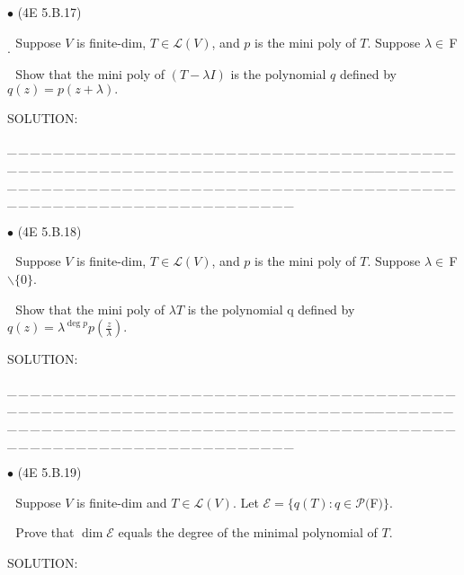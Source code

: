 \documentclass[a4paper, 11pt, UTF8]{article}
\def\Lm{\mathcal{L}}
\def\Po{\mathcal{P}}
\def\Fbfc{$\,{\timesbf F}$}
\begin{document}
\begin{large}
{\small $\bullet$} (\normalsize{4E 5.B.17})\par\,\, {\timessl\Large 
Suppose $V$ is finite-dim, $T\in \Lm(V)$, and $p$ is the mini poly of $T$. Suppose $\lambda \in\Fbfc.$}\par\,\,
{\timessl\Large Show that the mini poly of $(T - \lambda I)$ is the polynomial $q$ defined by $q(z) = p(z + \lambda).$
}\par
{\timesbf S\footnotesize{OLUTION:}}\par\quad

\par
{\tiny \_\,\_\,\_\,\_\,\_\,\_\,\_\,\_\,\_\,\_\,\_\,\_\,\_\,\_\,\_\,\_\,\_\,\_\,\_\,\_\,\_\,\_\,\_\,\_\,\_\,\_\,\_\,\_\,\_\,\_\,\_\,\_\,\_\,\_\,\_\,\_\,\_\,\_\,\_\,\_\,\_\,\_\,\_\,\_\,\_\,\_\,\_\,\_\,\_\,\_\,\_\,\_\,\_\,\_\,\_\,\_\,\_\,\_\,\_\,\_\,\_\,\_\,\_\,\_\,\_\,\_\,\_\,\_\,\_\,\_\,\_\_\,\_\,\_\,\_\,\_\,\_\,\_\,\_\,\_\,\_\,\_\,\_\,\_\,\_\,\_\,\_\,\_\,\_\,\_\,\_\,\_\,\_\,\_\,\_\,\_\,\_\,\_\,\_\,\_\,\_\,\_\,\_\,\_\,\_\,\_\,\_\,\_\,\_\,\_\,\_\,\_\,\_\,\_\,\_\,\_\,\_\,\_\,\_\,\_\,\_\,\_\,\_\,\_\,\_\,\_\,\_\,\_\,\_\,\_\,\_\,\_\,\_\,\_\,\_\,\_\,\_\,\_\,\_\,\_\,\_\,\_}\par

{\small $\bullet$} (\normalsize{4E 5.B.18})\par\,\, {\timessl\Large 
Suppose $V$ is finite-dim, $T\in \Lm(V)$, and $p$ is the mini poly of $T$. Suppose $\lambda \in\Fbfc\backslash\{0\}$.}\par\,\,
{\timessl\Large Show that the mini poly of $\lambda T$ is the polynomial q defined by $q(z) = \lambda^{\deg p} p(\frac{z}{\lambda})$.
}\par
{\timesbf S\footnotesize{OLUTION:}}\par\quad

\par
{\tiny \_\,\_\,\_\,\_\,\_\,\_\,\_\,\_\,\_\,\_\,\_\,\_\,\_\,\_\,\_\,\_\,\_\,\_\,\_\,\_\,\_\,\_\,\_\,\_\,\_\,\_\,\_\,\_\,\_\,\_\,\_\,\_\,\_\,\_\,\_\,\_\,\_\,\_\,\_\,\_\,\_\,\_\,\_\,\_\,\_\,\_\,\_\,\_\,\_\,\_\,\_\,\_\,\_\,\_\,\_\,\_\,\_\,\_\,\_\,\_\,\_\,\_\,\_\,\_\,\_\,\_\,\_\,\_\,\_\,\_\,\_\_\,\_\,\_\,\_\,\_\,\_\,\_\,\_\,\_\,\_\,\_\,\_\,\_\,\_\,\_\,\_\,\_\,\_\,\_\,\_\,\_\,\_\,\_\,\_\,\_\,\_\,\_\,\_\,\_\,\_\,\_\,\_\,\_\,\_\,\_\,\_\,\_\,\_\,\_\,\_\,\_\,\_\,\_\,\_\,\_\,\_\,\_\,\_\,\_\,\_\,\_\,\_\,\_\,\_\,\_\,\_\,\_\,\_\,\_\,\_\,\_\,\_\,\_\,\_\,\_\,\_\,\_\,\_\,\_\,\_\,\_}\par

{\small $\bullet$} (\normalsize{4E 5.B.19})\par\,\, {\timessl\Large 
Suppose $V$ is finite-dim and $T\in \Lm(V)$. Let $\mathcal{E} = \{q(T): q \in \Po(${\timesbf F}$)\}$.
}\par\,\,
{\timessl\Large
Prove that $\dim \mathcal{E}$ equals the degree of the minimal polynomial of $T$.
}\par
{\timesbf S\footnotesize{OLUTION:}}\par\quad


\end{large}
\end{document}
